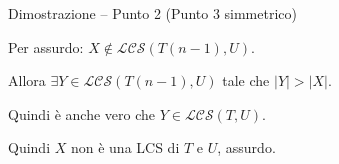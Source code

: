\begin{frame}{Dimostrazione -- Punto 2 (Punto 3 simmetrico)}

\vspace{-9pt}

\BIL
\item Per assurdo: \alert{$X \not\in \mathcal{LCS}( T(n-1), U)$}.
\item Allora $\exists Y \in \mathcal{LCS}( T(n-1), U)$ tale che $|Y| > |X|$.
\item Quindi è anche vero che $Y \in \mathcal{LCS}(T,U)$.
\item Quindi $X$ non è una LCS di $T$ e $U$, assurdo.
\EIL


\end{frame}

